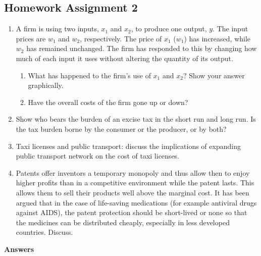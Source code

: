 \documentclass{article}
\begin{document}
\subsection*{Homework Assignment 2}
\begin{enumerate}
  \item A firm is using two inputs, \(x_1\) and \(x_2\), to produce one output, \(y\). The input prices are \(w_1\) and \(w_2\), respectively. The price of \(x_1\) (\(w_1\)) has increased, while \(w_2\) has remained unchanged. The firm has responded to this by changing how much of each input it uses without altering the quantity of its output.
  \begin{enumerate}
    \item What has happened to the firm’s use of \(x_1\) and \(x_2\)? Show your answer graphically.
    \item Have the overall costs of the firm gone up or down?
  \end{enumerate}
  \item Show who bears the burden of an excise tax in the short run and long run. Is the tax burden borne by the consumer or the producer, or by both?
  \item Taxi licenses and public transport: discuss the implications of expanding public transport network on the cost of taxi licenses.
  \item Patents offer inventors a temporary monopoly and thus allow then to enjoy higher profits than in a competitive environment while the patent lasts. This allows them to sell their products well above the marginal cost. It has been argued that in the case of life-saving medications (for example antiviral drugs against AIDS), the patent protection should be short-lived or none so that the medicines can be distributed cheaply, especially in less developed countries. Discuss.
\end{enumerate}
\nocite{Valrian_Inter_Micro}

\newpage

\textbf{Answers}
\end{document}
